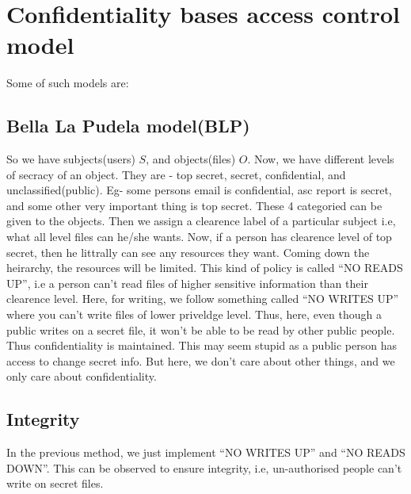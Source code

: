 \documentclass[english, 11pt]{article}
\begin{document}
\section*{Confidentiality bases access control model}
Some of such models are:
\subsection*{Bella La Pudela model(BLP)}
So we have subjects(users) $S$, and objects(files) $O$. Now, we have different levels of secracy of an object. They are - top secret, secret, confidential, and unclassified(public). Eg- some persons email is confidential, asc report is secret, and some other very important thing is top secret.
These 4 categoried can be given to the objects. Then we assign a clearence label of a particular subject i.e, what all level files can he/she wants. Now, if a person has clearence level of top secret, then he littrally can see any resources they want. Coming down the heirarchy, the resources will be limited.
This kind of policy is called ``NO READS UP'', i.e a person can't read files of higher sensitive information than their clearence level. Here, for writing, we follow something called ``NO WRITES UP'' where you can't write files of lower priveldge level. Thus, here, even though a public writes on a secret file, it won't be able to be read by other public people.
Thus confidentiality is maintained. This may seem stupid as a public person has access to change secret info. But here, we don't care about other things, and we only care about confidentiality.

\subsection*{Integrity}
In the previous method, we just implement ``NO WRITES UP'' and ``NO READS DOWN''. This can be observed to ensure integrity, i.e, un-authorised people can't write on secret files.
\end{document}
